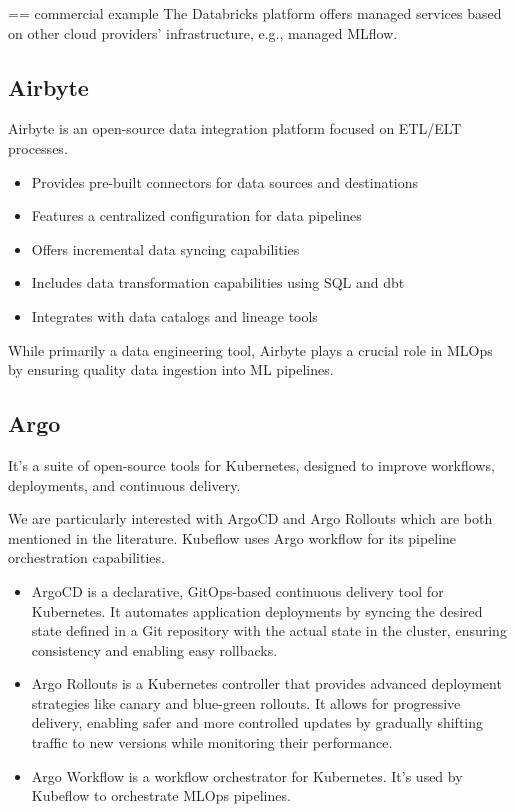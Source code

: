 == commercial example
The Databricks platform offers managed services based on
other cloud providers’ infrastructure, e.g., managed
MLflow.

\subsection{Airbyte}\label{subsec:airbyte}
Airbyte is an open-source data integration platform focused on ETL/ELT processes\cite{airbyte}.

\begin{itemize}
\item Provides pre-built connectors for data sources and destinations
\item Features a centralized configuration for data pipelines
\item Offers incremental data syncing capabilities
\item Includes data transformation capabilities using SQL and dbt
\item Integrates with data catalogs and lineage tools
\end{itemize}

While primarily a data engineering tool, Airbyte plays a crucial role in MLOps by ensuring quality data ingestion into ML pipelines.

\subsection{Argo}\label{subsec:argo}\cite{argo}
It's a suite of open-source tools for Kubernetes, designed to improve workflows, deployments, and continuous delivery.

We are particularly interested with ArgoCD and Argo Rollouts which are both mentioned in the literature\cite{inproceedings}.
Kubeflow uses Argo workflow for its pipeline orchestration capabilities.

\begin{itemize}
    \item ArgoCD
     is a declarative, GitOps-based continuous delivery tool for Kubernetes.
     It automates application deployments by syncing the desired state
     defined in a Git repository with the actual state in the cluster,
     ensuring consistency and enabling easy rollbacks.

    \item Argo Rollouts
     is a Kubernetes controller that provides advanced deployment strategies
     like canary and blue-green rollouts.
     It allows for progressive delivery, enabling safer and more controlled updates by gradually
     shifting traffic to new versions while monitoring their performance.

    \item Argo Workflow
    is a workflow orchestrator for Kubernetes.
    It's used by Kubeflow to orchestrate MLOps pipelines.
\end{itemize}

